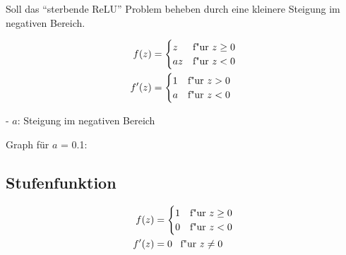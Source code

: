 \documentclass[12pt,titlepage]{article}
\begin{document}
Soll das \enquote{sterbende ReLU} Problem beheben durch eine kleinere Steigung im negativen Bereich.

\[
  \begin{aligned}
    f(z)  & = \begin{cases}
                z  & \textnormal{f"ur} \ z \geq 0 \\
                az & \textnormal{f"ur} \ z < 0
              \end{cases} \\
    f'(z) & = \begin{cases}
                1 & \textnormal{f"ur} \ z > 0 \\
                a & \textnormal{f"ur} \ z < 0
              \end{cases}
  \end{aligned}
\]

- $a$: Steigung im negativen Bereich

Graph für $a$ = 0.1:


\subsection{Stufenfunktion}

\[
  \begin{aligned}
    f(z)  & = \begin{cases}
                1 & \textnormal{f"ur} \ z \geq 0 \\
                0 & \textnormal{f"ur} \ z < 0
              \end{cases}      \\
    f'(z) & = 0 \;\;\; \textnormal{f"ur} \ z \neq 0
  \end{aligned}
\]
\end{document}
